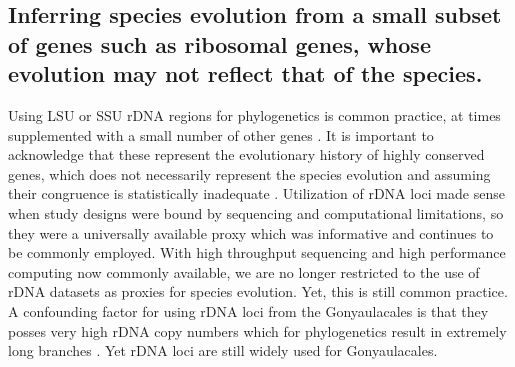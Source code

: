 \documentclass[12pt]{article}
\begin{document}
\subsection*{Inferring species evolution from a small subset of genes such as ribosomal genes, whose evolution may not reflect that of the species.}
\FloatBarrier 
Using LSU or SSU rDNA regions for phylogenetics is common practice, at times supplemented with a small number of other genes \cite{shalchian2006combined,zhang2007three,saldarriaga2004molecular,murray2005improving,hoppenrath2010dinoflagellate}. 
It is important to acknowledge that these represent the evolutionary history of highly conserved genes, which does not necessarily represent the species evolution and assuming their congruence is statistically inadequate \cite{degnan2009gene}.
Utilization of rDNA loci made sense when study designs were bound by sequencing and computational limitations, so they were a universally available proxy which was informative and continues to be commonly employed. 
With high throughput sequencing and high performance computing now commonly available, we are no longer restricted to the use of rDNA datasets as proxies for species evolution. 
Yet, this is still common practice. 
A confounding factor for using rDNA loci from the Gonyaulacales is that they posses very high rDNA copy numbers which for phylogenetics result in extremely long branches \cite{he2016reducing}. 
Yet rDNA loci are still widely used for Gonyaulacales. 
\end{document}
